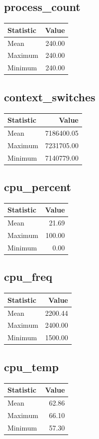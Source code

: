 \documentclass[11pt]{article}
\begin{document}
\subsection{process_count}
\begin{tabular}{lr}
\toprule
Statistic & Value \\
\midrule
Mean & 240.00 \\
Maximum & 240.00 \\
Minimum & 240.00 \\
\bottomrule
\end{tabular}


\subsection{context_switches}
\begin{tabular}{lr}
\toprule
Statistic & Value \\
\midrule
Mean & 7186400.05 \\
Maximum & 7231705.00 \\
Minimum & 7140779.00 \\
\bottomrule
\end{tabular}


\subsection{cpu_percent}
\begin{tabular}{lr}
\toprule
Statistic & Value \\
\midrule
Mean & 21.69 \\
Maximum & 100.00 \\
Minimum & 0.00 \\
\bottomrule
\end{tabular}


\subsection{cpu_freq}
\begin{tabular}{lr}
\toprule
Statistic & Value \\
\midrule
Mean & 2200.44 \\
Maximum & 2400.00 \\
Minimum & 1500.00 \\
\bottomrule
\end{tabular}


\subsection{cpu_temp}
\begin{tabular}{lr}
\toprule
Statistic & Value \\
\midrule
Mean & 62.86 \\
Maximum & 66.10 \\
Minimum & 57.30 \\
\bottomrule
\end{tabular}
\end{document}
